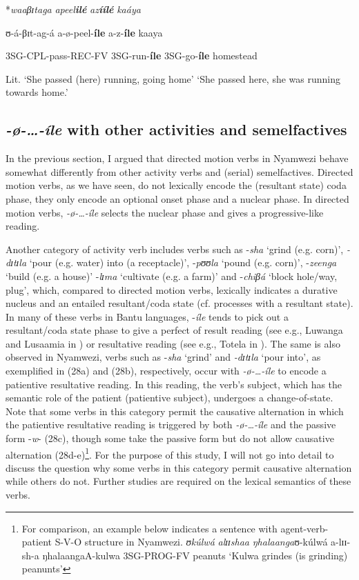 \documentclass[output=paper,newtxmath,modfonts,nonflat,draftmode]{langsci/langscibook}
\begin{document}
\ex
*\textit{waaβɪ}\textit{taga}                   \textit{apeel}\textbf{\textit{ilé}}       \textit{az}\textbf{\textit{íílé}}        \textit{kaáya}

    ʊ-á-βɪt-ag-á                a-ø-peel-\textbf{íle} a-z-\textbf{íle}       kaaya

    3SG-CPL-pass-REC-FV 3SG-run-\textbf{íle} 3SG-go-\textbf{íle} homestead 

    Lit. ‘She passed (here) running, going home’
    ‘She passed here, she was running towards home.’
\z
\z
\subsection{\textit{-}\textit{ø-…-íle} with other activities and semelfactives}

In the previous section, I argued that directed motion verbs in Nyamwezi behave somewhat differently from other activity verbs and (serial) semelfactives. Directed motion verbs, as we have seen, do not lexically encode the (resultant state) coda phase, they only encode an optional onset phase and a nuclear phase. In directed motion verbs, \textit{-ø-}\textit{…-íle} selects the nuclear phase and gives a progressive-like reading.

Another category of activity verb includes verbs such as -\textit{sha} ‘grind (e.g. corn)’, \textit{-dɪ}\textit{tɪ}\textit{la} ‘pour (e.g. water) into (a receptacle)’, -\textit{pʊʊ}\textit{la} ‘pound (e.g. corn)’, -\textit{zeenga} ‘build (e.g. a house)’ -\textit{lɪ}\textit{ma} ‘cultivate (e.g. a farm)’ and -\textit{chiβá} ‘block hole/way, plug’, which, compared to directed motion verbs, lexically indicates a durative nucleus and an entailed resultant/coda state (cf.  processes with a resultant state). In many of these verbs in Bantu languages, -\textit{íle} tends to pick out a resultant/coda state phase to give a perfect of result reading (see e.g., Luwanga and Lusaamia in \citet{Botne2010}) or resultative reading (see e.g., Totela in \citet{Crane2013}). The same is also observed in Nyamwezi, verbs such as -\textit{sha} ‘grind’ and \textit{-dɪ}\textit{tɪ}\textit{la} ‘pour into’, as exemplified in (28a) and (28b), respectively, occur with \textit{-ø}\textit{-…-íle} to encode a patientive resultative reading. In this reading, the verb’s subject, which has the semantic role of the patient (patientive subject), undergoes a change-of-state. Note that some verbs in this category permit the causative alternation in which the patientive resultative reading is triggered by both \textit{-ø}\textit{-…-íle} and the passive form -\textit{w}- (28c), though some take the passive form but do not allow causative alternation (28d-e)\footnote{For comparison, an example below indicates a sentence with agent-verb-patient S-V-O structure in Nyamwezi.       \textit{ʊkúlwá}    \textit{al}\textit{ɪɪshaa}          \textit{ŋhalaanga}ʊ-kúlwá  a-lɪɪ-sh-a         ŋhalaangaA-kulwa 3SG-PROG-FV peanuts ‘Kulwa grindes (is grinding) peanunts’}. For the purpose of this study, I will not go into detail to discuss the question why some verbs in this category permit causative alternation while others do not. Further studies are required on the lexical semantics of these verbs. 
\end{document}
